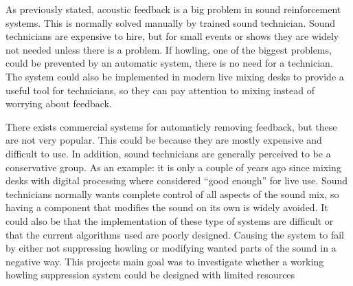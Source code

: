 As previously stated, acoustic  feedback is a big problem in sound reinforcement systems. This is normally solved manually by trained sound technician. Sound technicians are expensive to hire, but for small events or shows they are widely not needed unless there is a problem. If howling, one of the biggest problems, could be prevented by an automatic system, there is no need for a technician. The system could also be implemented in modern live mixing desks to provide a useful tool for technicians, so they can pay attention to mixing instead of worrying about feedback.

There exists commercial systems for automaticly removing feedback, but these are not very popular. This could be because they are mostly expensive and difficult to use. In addition, sound technicians are generally perceived to be a conservative group. As an example: it is only a couple of years ago since mixing desks with digital processing where considered ``good enough'' for live use. Sound technicians normally wants complete control of all aspects of the sound mix, so having a component that modifies the sound on its own is widely avoided. It could also be that the implementation of these type of systems are difficult or that the current algorithms used are poorly designed. Causing the system to fail by either not suppressing howling or modifying wanted parts of the sound in a negative way. This projects main goal was to investigate whether a working howling suppression system could be designed with limited resources
